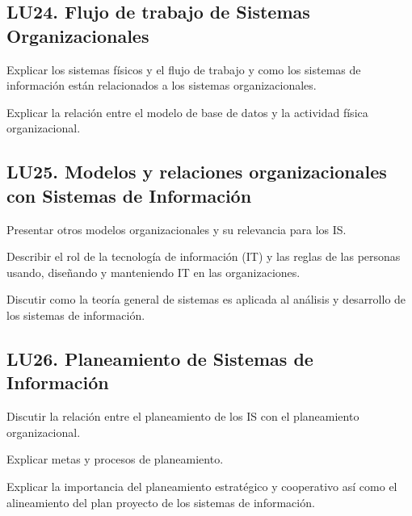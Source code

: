 \subsection{LU24. Flujo de trabajo de Sistemas Organizacionales}\label{sec:BOK-LU24}\label{sec:LU24}
\begin{LearningUnit}
\begin{LUGoal}
\item Explicar los sistemas físicos y el flujo de trabajo y como los sistemas de información están relacionados a los sistemas organizacionales.
\end{LUGoal}

\begin{LUObjective}
\item Explicar la relación entre el modelo de base de datos   y la actividad física organizacional.
\end{LUObjective}
\end{LearningUnit}

\subsection{LU25. Modelos y relaciones organizacionales con Sistemas de Información}\label{sec:BOK-LU25}\label{sec:LU25}
\begin{LearningUnit}
\begin{LUGoal}
\item Presentar otros modelos organizacionales  y su relevancia para los IS.
\end{LUGoal}

\begin{LUObjective}
\item Describir el rol de la tecnología de información (IT) y las reglas de las personas usando, diseñando y manteniendo IT en las organizaciones.
\item Discutir como la teoría general de sistemas es aplicada al análisis y desarrollo de los sistemas de información.
\end{LUObjective}
\end{LearningUnit}

\subsection{LU26. Planeamiento de Sistemas de Información}\label{sec:BOK-LU26}\label{sec:LU26}
\begin{LearningUnit}
\begin{LUGoal}
\item Discutir la relación  entre el planeamiento de los IS  con el planeamiento organizacional.
\end{LUGoal}

\begin{LUObjective}
\item Explicar metas y procesos de planeamiento.
\item Explicar la importancia del planeamiento estratégico  y cooperativo  así como el alineamiento del plan proyecto de los sistemas de información.
\end{LUObjective}
\end{LearningUnit}

